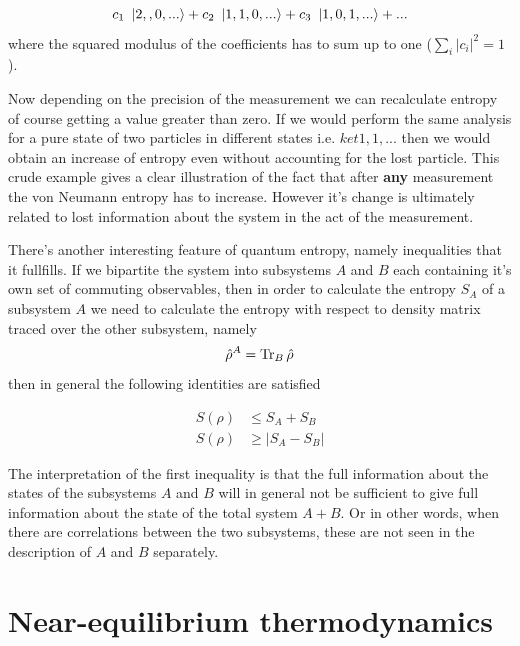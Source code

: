 \documentclass[a4paper,12pt]{article}
\begin{document}
\begin{equation}
  c_1\ \ket{2,,0,...}+c_2\ \ket{1,1,0,...}+  c_3\ \ket{1,0,1,...}+...
\end{equation}
where the  squared modulus of the coefficients has to sum up to one ($ \sum_i \left| c_i \right|^2 = 1 $).

Now depending on the precision of the measurement we can recalculate entropy of course getting a value greater than zero. If we would perform the same analysis for a pure state of two particles in different states i.e. $ket{1,1,...}$ then we would obtain an increase of entropy even without accounting for the lost particle.
This crude example gives a clear illustration of the fact that after \textbf{any} measurement the von Neumann entropy has to increase. However it's change is ultimately related to lost information about the system in the act of the measurement.

There's another interesting feature of quantum entropy, namely inequalities that it fullfills.
If we bipartite the system into subsystems $A$ and $B$ each containing it's own set of commuting observables, then in order to calculate the entropy $S_A$ of a subsystem $A$ we need to calculate the entropy with respect to density matrix traced over the other subsystem, namely
\begin{equation}
  \hat{\rho}^A = \Tr_B \hat{\rho} 
\end{equation}
then in general the following identities are satisfied

\begin{equation}
\begin{aligned}
	S(\rho) &\leq S_A + S_B	\\
	S(\rho) &\geq \left| S_A - S_B \right|
\end{aligned}
\end{equation}

The interpretation of the first inequality is that the full information about the states of the subsystems $A$ and $B$ will in general not be sufficient to give full information about the state of the total system $A+B$. Or in other words, when there are correlations between the two subsystems, these are not seen in the description of $A$ and $B$ separately. 

\section{Near-equilibrium thermodynamics}
\end{document}
